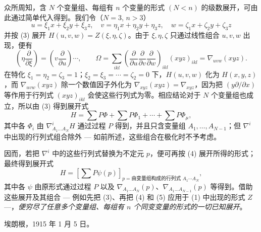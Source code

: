 众所周知，含 $N$ 个变量组、每组有 $n$ 个变量的形式 $(N<n)$ 的级数展开，可由此通过简单代入得到。我们令（$N=3$, $n>3$）
\[
  u=\xi_1x+\xi_2y+\xi_3z,
  \quad v=\eta_1x+\eta_2y+\eta_3z,
  \quad w=\zeta_1x+\zeta_2y+\zeta_3z
\]
并按 (3) 展开 $H(u,v,w)=Z(\xi,\eta,\zeta)$。由于 $\xi,\eta,\zeta$ 只通过线性组合 $u,v,w$ 出现，便有
\[
  \left(\eta\frac{\partial}{\partial \xi}\right)=
  \left(v\frac{\partial}{\partial u}\right)\cdots,
  \qquad
  \Omega=\sum_{ikl}\left(\frac{\partial}{\partial u}
  \frac{\partial}{\partial v}
  \frac{\partial}{\partial w}\right)_{ikl}(xyz)_{ikl}
  =\nabla_{uvw}(xyz).
\]
在特化 $\xi_1=\eta_2=\zeta_3=1$；$\xi_2=\xi_3=\cdots=\zeta_2=0$ 下，$H(u,v,w)$ 化为 $H(x,y,z)$，而 $\nabla_{uvw}(xyz)$ 除一个数值因子外化为 $\nabla_{xyz}(xyz)=\nabla_{xyz}$，因为把 $(y\partial/\partial x)$ 等作用于行列式 $(xyz)_{ikl}$ 会使这些行列式为零。相应结论对于 $N$ 个变量组也成立，所以由 (3) 得到展开式
\begin{equation}
  H=\sum P\Phi+\sum P\Phi_1+\cdots+\sum P\Phi_\mu,
\tag{4}
\end{equation}
其中各 $\Phi_i$ 由 $\nabla^i_{A_1\ldots A_N}H$ 通过过程 $P$ 得到，并且只含变量组 $A_1,
\ldots,A_{N-1}$；但 $\nabla^i$ 中出现的行列式组合除外 --- 如前所述，这些组合在极化时不予考虑。

因而，若把 $\nabla^i$ 中的这些行列式替换为不定元 $p$，便可再按 (4) 展开所得的形式；最终得到展开式
\begin{equation}
  H=\left[\sum P\psi(p)\right]_{p=\text{由变量组构成的行列式 }A_1\cdots A_N},
\tag{5}
\end{equation}
其中各 $\psi$ 由原形式通过过程 $P$ 以及 $\nabla_{A_1\ldots A_N}(p)$、$\nabla_{A_1\ldots A_{N-1}}(p)$ 等得到。借助这些展开及其组合 --- 例如先把 (3)、再把 (4) 和 (5) 应用于 (1) 中出现的形式 $Z$ ---，\emph{便穷尽了任意多个变量组、每组有 $n$ 个同变变量的形式的一切已知展开}。

埃朗根，1915 年 1 月 5 日。

